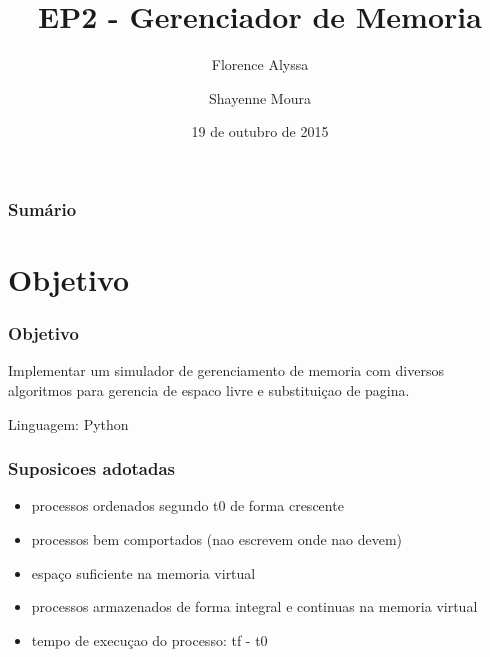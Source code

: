 \documentclass{beamer}
\title{EP2 - Gerenciador de Memoria} %
\author{Florence Alyssa \and Shayenne Moura} %
\institute[USP] %
{
Sistemas Operacionais
 \\ Bacharelado em Ciência da Computação%
\medskip
\textit{} %
}
\date{19 de outubro de 2015} %
\begin{document}
\begin{frame}
\titlepage %
\end{frame}

\begin{frame}
\frametitle{Sumário}
\tableofcontents
\end{frame}




\section{Objetivo} 

\begin{frame}
\frametitle{Objetivo}
Implementar um simulador de gerenciamento de memoria com diversos algoritmos para gerencia de espaco livre e substituiçao de pagina.

Linguagem: Python
\end{frame}

\begin{frame}
\frametitle{Suposicoes adotadas}
\begin{itemize}
\item processos ordenados segundo t0 de forma crescente
\item processos bem comportados (nao escrevem onde nao devem)
\item espaço suficiente na memoria virtual
\item processos armazenados de forma integral e continuas na memoria virtual
\item tempo de execuçao do processo: tf - t0
\end{itemize}

\end{frame}
\end{document}
